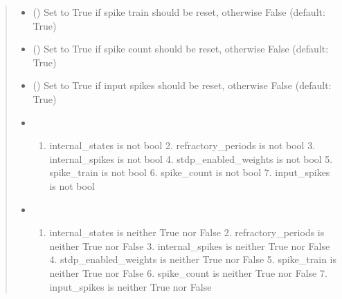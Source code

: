 \documentclass[letterpaper,10pt,english]{sphinxmanual}
\begin{document}
\begin{fulllineitems}
\begin{fulllineitems}
\begin{quote}
\begin{description}
\begin{itemize}
\item {} 
\sphinxAtStartPar
{} () \textendash{} Set to True if spike train should be reset, otherwise False (default: True)

\item {} 
\sphinxAtStartPar
{} () \textendash{} Set to True if spike count should be reset, otherwise False (default: True)

\item {} 
\sphinxAtStartPar
{} () \textendash{} Set to True if input spikes should be reset, otherwise False (default: True)

\end{itemize}

\begin{itemize}
\item {} 
\sphinxAtStartPar
{} \textendash{} \begin{enumerate}
%
\item {} 
\sphinxAtStartPar
internal\_states is not bool
    2. refractory\_periods is not bool
    3. internal\_spikes is not bool
    4. stdp\_enabled\_weights is not bool
    5. spike\_train is not bool
    6. spike\_count is not bool
    7. input\_spikes is not bool

\end{enumerate}


\item {} 
\sphinxAtStartPar
{} \textendash{} \begin{enumerate}
%
\item {} 
\sphinxAtStartPar
internal\_states is neither True nor False
    2. refractory\_periods is neither True nor False
    3. internal\_spikes is neither True nor False
    4. stdp\_enabled\_weights is neither True nor False
    5. spike\_train is neither True nor False
    6. spike\_count is neither True nor False
    7. input\_spikes is neither True nor False

\end{enumerate}


\end{itemize}


\end{description}
\end{quote}
\end{fulllineitems}
\end{fulllineitems}
\end{document}

